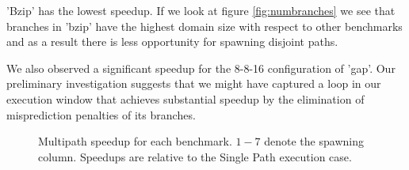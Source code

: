 \documentclass[10pt,dvips]{article}
\begin{document}
'Bzip' has the lowest speedup.  If we look at 
figure \ref{fig:numbranches} we 
see that branches in 'bzip' have
the highest domain size with respect to other benchmarks and
as a result there is less opportunity for spawning
disjoint paths.

We also observed a significant speedup for the 8-8-16 configuration
of 'gap'.  Our preliminary investigation suggests
that we might have captured 
a loop in our execution window that achieves substantial speedup 
by the elimination
of misprediction penalties of its branches.

\begin{figure}
\centering
{}
\caption{ Multipath speedup for each benchmark.  $1-7$ denote the
spawning column. 
Speedups are relative to the Single Path execution case.}
\label{fig:figall}
\end{figure}
%
%
%
%
%
%
\end{document}
